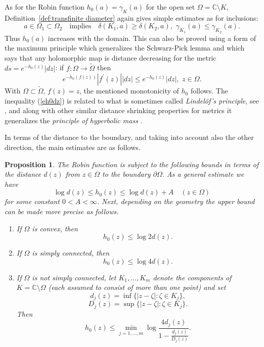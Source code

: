 \documentclass[reqno,12pt]{article}
\theoremstyle{plain}
\newtheorem{proposition}[thm]{Proposition}
\theoremstyle{definition}
\numberwithin{equation}{section}
\numberwithin{figure}{section}
\def\C{{\mathbb C}}
\begin{document}
As for the Robin function $h_0(a)=\gamma_K(a)$ for the open set $\Omega=\C\setminus K$, 
Definition~\ref{def:transfinite diameter} again gives simple estimates as for inclusions: 
$$
a\in\Omega_1\subset \Omega_2 \quad\text{implies}\quad \delta(K_1,a)\geq \delta(K_2,a), \,\,
\gamma_{K_1}(a)\leq \gamma_{K_2}(a).
$$ 
Thus $h_0(a)$ increases with the domain. This can also be proved using a form of the maximum principle which generalizes the
Schwarz-Pick lemma and which says that any holomorphic map is distance decreasing for the metric $ds =e^{-h_0(z)}|dz|$: 
if $f:\Omega\to \tilde{\Omega}$ then
\begin{equation}\label{eh0dz}
e^{-\tilde{h}_0(f(z))}|f^\prime (z)||dz|\leq e^{-h_0(z)}|dz|,\,\, z\in\Omega.
\end{equation}
With $\Omega\subset\tilde{\Omega}$, $f(z)=z$, the mentioned monotonicity of $h_0$ follows.
The inequality (\ref{eh0dz}) is related to what is sometimes called {\it Lindel\"of's principle}, see 
\cite{Nevanlinna-1953, Gustafsson-1979}, 
and along with other similar distance shrinking properties for metrics \cite{Krantz-2004, Beardon-Minda-2007} it
generalizes the {\it principle of hyperbolic mass} \cite{Minda-Wright-1982}.

In terms of the distance to the boundary, and taking into account also the other direction,
the main estimates are as follows.
\begin{proposition}\label{prop:estimates}
The Robin function is subject to the following bounds in terms of the distance
$d(z)$ from $z\in \Omega$ to the boundary $\partial\Omega$. As a general estimate we have
$$
\log d(z)\leq h_0(z) \leq \log d(z) +A \quad(z\in\Omega)
$$
for some constant $0<A<\infty$.
Next,  depending on the geometry the upper bound can be made more precise as follows.
\begin{enumerate}
\item If $\Omega$ is convex, then
$$ 
h_0(z)\leq \log 2d(z).
$$

\item If $\Omega$ is simply connected, then
$$
h_0(z)\leq\log 4d(z).
$$

\item If $\Omega$ is not simply connected, 
let $K_1,\dots, K_m$ denote the components of $K=\C\setminus \Omega$ (each assumed to 
consist of more than one point) and set
$$
d_j(z)=\inf\{ |z-\zeta|: \zeta\in K_j\},
$$
$$
D_j(z)=\sup\{ |z-\zeta|: \zeta\in K_j\}.
$$
Then
$$
h_0(z)\leq \min_{j=1,\dots,m} \log\frac{4d_j(z)}{1-\frac{d_j(z)}{D_j(z)}}.
$$
\end{enumerate} 
\end{proposition}
\end{document}
